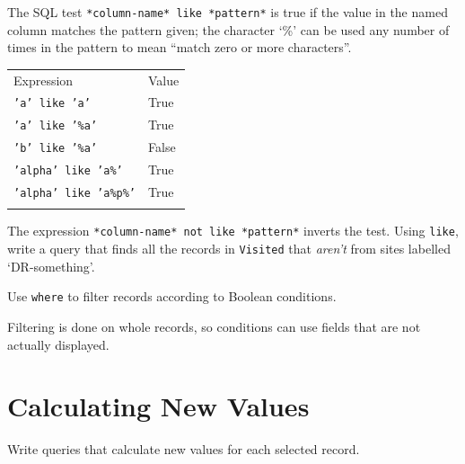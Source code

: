 \documentclass{book}
\begin{document}
\begin{challenge}
  The SQL test \texttt{*column-name* like *pattern*} is true if the
  value in the named column matches the pattern given; the character
  `\%' can be used any number of times in the pattern to mean ``match
  zero or more characters''.

  \begin{tabular}{@{}ll@{}}
  \hline\noalign{\medskip}
  Expression & Value
  \\\noalign{\medskip}
  \hline\noalign{\medskip}
  \texttt{'a' like 'a'} & True
  \\\noalign{\medskip}
  \texttt{'a' like '\%a'} & True
  \\\noalign{\medskip}
  \texttt{'b' like '\%a'} & False
  \\\noalign{\medskip}
  \texttt{'alpha' like 'a\%'} & True
  \\\noalign{\medskip}
  \texttt{'alpha' like 'a\%p\%'} & True
  \\\noalign{\medskip}
  \hline
  \end{tabular}

  The expression \texttt{*column-name* not like *pattern*} inverts the
  test. Using \texttt{like}, write a query that finds all the records in
  \texttt{Visited} that \emph{aren't} from sites labelled
  `DR-something'.
\end{challenge}

\begin{keypoints}
\begin{swcitemize}
\item
  Use \texttt{where} to filter records according to Boolean conditions.
\item
  Filtering is done on whole records, so conditions can use fields that
  are not actually displayed.
\end{swcitemize}
\end{keypoints}

\section{Calculating New Values}

\begin{objectives}
\begin{swcitemize}
\item
  Write queries that calculate new values for each selected record.
\end{swcitemize}
\end{objectives}
\end{document}
